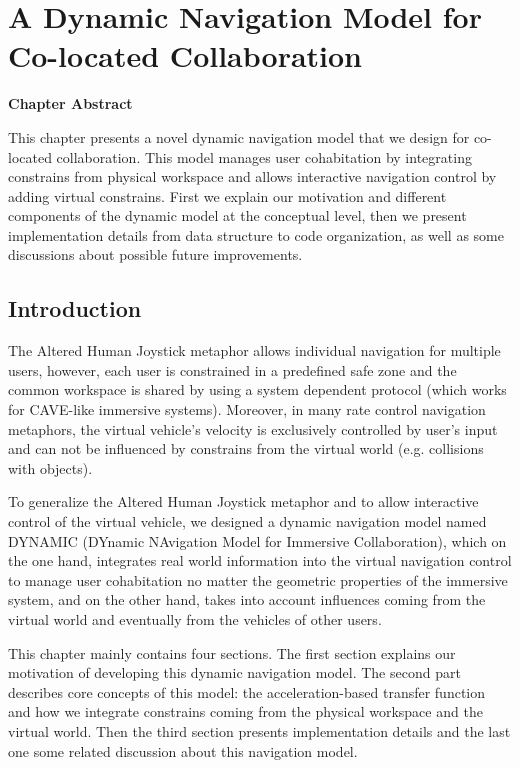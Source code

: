 \chapter{A Dynamic Navigation Model for Co-located Collaboration}
\label{chapter:dynamic_model}
\pagebreak

\textbf{Chapter Abstract}

This chapter presents a novel dynamic navigation model that we design for co-located collaboration. This model manages user cohabitation by integrating constrains from physical workspace and allows interactive navigation control by adding virtual constrains. First we explain our motivation and different components of the dynamic model at the conceptual level, then we present implementation details from data structure to code organization, as well as some discussions about possible future improvements.

\vspace*{2\baselineskip}

\minitoc

\newpage
\section{Introduction}
The Altered Human Joystick metaphor allows individual navigation for multiple users, however, each user is constrained in a predefined safe zone and the common workspace is shared by using a system dependent protocol (which works for CAVE-like immersive systems). Moreover, in many rate control navigation metaphors, the virtual vehicle's velocity is exclusively controlled by user's input and can not be influenced by constrains from the virtual world (e.g. collisions with objects). 

To generalize the Altered Human Joystick metaphor and to allow interactive control of the virtual vehicle, we designed a dynamic navigation model named DYNAMIC (DYnamic NAvigation Model for Immersive Collaboration), which on the one hand, integrates real world information into the virtual navigation control to manage user cohabitation no matter the geometric properties of the immersive system, and on the other hand, takes into account influences coming from the virtual world and eventually from the vehicles of other users.

This chapter mainly contains four sections. The first section explains our motivation of developing this dynamic navigation model. The second part describes core concepts of this model: the acceleration-based transfer function and how we integrate constrains coming from the physical workspace and the virtual world. Then the third section presents implementation details and the last one some related discussion about this navigation model.

